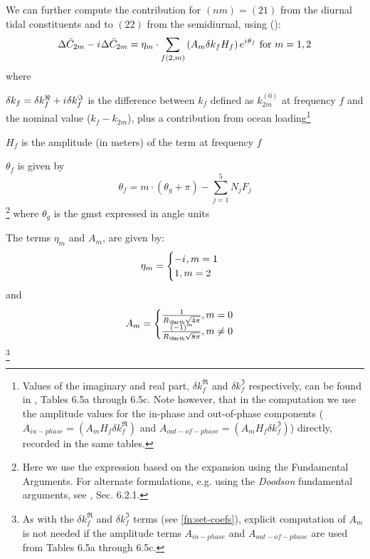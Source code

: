 We can further compute the contribution for $(nm)=(21)$ from the 
diurnal tidal constituents and to $(22)$ from the semidiurnal, using 
(\cite{iers2010}):
\begin{equation}
  \Delta \bar{C}_{2m} - {i\mkern1mu} \Delta \bar{C}_{2m} = 
    \eta _m \cdot \sum _{f(2,m)} \left( A_m \delta k_f H_f\right) e^{{i\mkern1mu} \theta _f} 
    \text{ for } m=1,2
  \label{eq:iers1068b}
\end{equation}
where 
\begin{description}
  \item $\delta k_f = \delta k^\Re _f + {i\mkern1mu} \delta k^\Im _f$ is the difference 
  between $k_f$ defined as $k^{(0)}_{2m}$ at frequency $f$ and the 
  nominal value ($k_f - k_{2m}$), plus a contribution from ocean 
  loading\footnote{\label{fn:set-coefs}Values of the imaginary and real part, $\delta k^\Re _f$ and 
  $\delta k^\Im _f$ respectively, can be found in \cite{iers2010}, Tables 6.5a 
  through 6.5c. Note however, that in the computation we use the amplitude values 
  for the in-phase and out-of-phase components ($A_{in-phase} = \left(A_m H_f \delta k^\Re _f \right)$ 
  and $A_{out-of-phase} = \left( A_m H_f \delta k^\Im _f \right)$) directly, recorded 
  in the same tables.}
  \item $H_f$ is the amplitude (in meters) of the term at frequency $f$
  \item $\theta _f$ is given by 
  \begin{equation} \theta _f = m \cdot ( \theta _g + \pi ) - \sum ^5_{j=1} N_j F_j \end{equation}
  \footnote{Here we use the expression based on the expansion using the Fundamental 
  Arguments. For alternate formulations, e.g. using the \emph{Doodson} fundamental 
  arguments, see \cite{iers2010}, Sec. 6.2.1.}
  where $\theta _g$ is the \gls{gmst} expressed in angle units

  \item The terms $\eta _m$ and $A_m$, are given by: 
  \begin{equation}
  \eta _m = 
    \begin{cases} -{i\mkern1mu} , m=1 \\ 1 , m=2\end{cases}
  \end{equation} and
  \begin{equation} 
    A_m = \begin{cases} 
        \frac{1}{R_{\Earth}\sqrt{4 \pi}}, m=0\\
        \frac{(-1)^m}{R_{\Earth}\sqrt{8 \pi}}, m \ne 0
    \end{cases}
  \end{equation}\footnote{As with the $\delta k^\Re _f$ and $\delta k^\Im _f$ terms 
  (see \autoref{fn:set-coefs}), explicit computation of $A_m$ is not needed if the 
  amplitude terms $A_{in-phase}$ and $A_{out-of-phase}$ are used from 
  \cite{iers2010} Tables 6.5a through 6.5c.}
\end{description}

